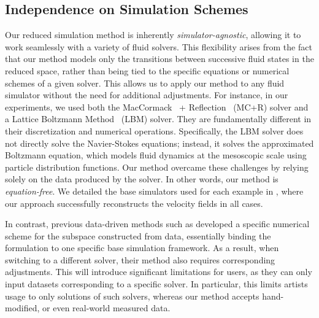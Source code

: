 \subsection{Independence on Simulation Schemes}
Our reduced simulation method is inherently \emph{simulator-agnostic}, allowing it to work seamlessly with a variety of fluid solvers. This flexibility arises from the fact that our method models only the transitions between successive fluid states in the reduced space, rather than being tied to the specific equations or numerical schemes of a given solver. This allows us to apply our method to any fluid simulator without the need for additional adjustments. For instance, in our experiments, we used both the MacCormack~\cite{selle2008unconditionally} + Reflection~\cite{zehnder2018advection} (MC+R) solver and a Lattice Boltzmann Method~\cite{chen1998lattice} (LBM) solver. They are fundamentally different in their discretization and numerical operations. Specifically, the LBM solver does not directly solve the Navier-Stokes equations; instead, it solves the approximated Boltzmann equation, which models fluid dynamics at the mesoscopic scale using particle distribution functions. Our method overcame these challenges by relying solely on the data produced by the solver. In other words, our method is \emph{equation-free}. We detailed the base simulators used for each example in , where our approach successfully reconstructs the velocity fields in all cases. 

In contrast, previous data-driven methods such as \cite{treuille2006model, kim2013subspace} developed a specific numerical scheme for the subspace constructed from data, essentially binding the formulation to one specific base simulation framework. As a result, when switching to a different solver, their method also requires corresponding adjustments. This will introduce significant limitations for users, as they can only input datasets corresponding to a specific solver. In particular, this limits artists usage to only solutions of such solvers, whereas our method accepts hand-modified, or even real-world measured data.

